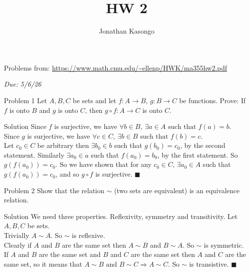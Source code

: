 \documentclass{article}
\author{Jonathan Kasongo}
\title{HW 2}
\begin{document}
\maketitle

Problems from: \url{https://www.math.cmu.edu/~ellenp/HWK/ma355hw2.pdf}

\textit{Due: 5/6/26}

\begin{problem}{Problem 1}
Let $A, B, C$ be sets and let $f : A \rightarrow B$, $g : B \rightarrow C$
be functions. Prove: If $f$ is onto $B$ and $g$ is onto $C$, then
$g \circ f : A \rightarrow C$ is onto $C$.
\end{problem}

\begin{solution}{Solution}
Since $f$ is surjective, we have
$\forall b \in B, \ \exists a \in A \text{ such that } f(a) = b$. \\

Since $g$ is surjective, we have
$\forall c \in C, \ \exists b \in B \text{ such that } f(b) = c$. \\

Let $c_0 \in C$ be arbitrary
then $\exists b_0 \in b$ such that $g(b_0) = c_0$, by the second statement.
Similarly $\exists a_0 \in a$ such that $f(a_0) = b_0$, by the first
statement. So $g(f(a_0)) = c_0$. So we have shown that for any $c_0 \in C$,
$\exists a_0 \in A$ such that $g(f(a_0)) = c_0$, and so $g\circ f$ is
surjective. $\blacksquare$
\end{solution}
\vspace{0.4cm}

\begin{problem}{Problem 2}
Show that the relation $\sim$ (two sets are equivalent) is an equivalence
relation.
\end{problem}

\begin{solution}{Solution}
We need three properties. Reflexivity, symmetry and transitivity. Let
$A,B,C$ be sets.
\\

Trivially $A \sim A$. So $\sim$ is reflexive. \\

Clearly if $A$ and $B$ are the same set then $A \sim B$ and $B \sim A$.
So $\sim$ is symmetric. \\

If $A$ and $B$ are the same set and $B$ and $C$ are the same set then
$A$ and $C$ are the same set, so it means that
$A \sim B \text{ and } B \sim C \Rightarrow A \sim C$. So $\sim$ is
transistive. $\blacksquare$
\end{solution}
\vspace{0.4cm}
\end{document}
